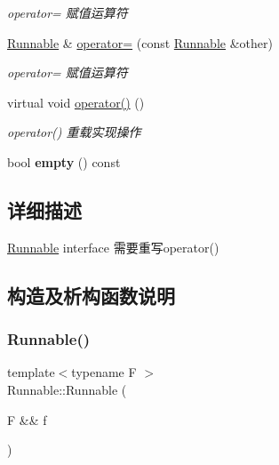 \begin{DoxyCompactItemize}
\begin{DoxyCompactList}\small\item\em operator= 赋值运算符 \end{DoxyCompactList}\item 
\hyperlink{classRunnable}{Runnable} \& \hyperlink{classRunnable_aac70062e7bc1f55cc1695fa37d75df53}{operator=} (const \hyperlink{classRunnable}{Runnable} \&other)
\begin{DoxyCompactList}\small\item\em operator= 赋值运算符 \end{DoxyCompactList}\item 
\mbox{\label{classRunnable_a38bf849dab4bbb86fc5bc6e7aff383e0}} 
virtual void \hyperlink{classRunnable_a38bf849dab4bbb86fc5bc6e7aff383e0}{operator()} ()
\begin{DoxyCompactList}\small\item\em operator() 重载实现操作 \end{DoxyCompactList}\item 
\mbox{\label{classRunnable_a3abba14a5cf19709cef2d299ee68acae}} 
bool {\bfseries empty} () const
\end{DoxyCompactItemize}


\subsection{详细描述}
\hyperlink{classRunnable}{Runnable} interface 需要重写operator() 

\subsection{构造及析构函数说明}
\mbox{\label{classRunnable_ab052afa8b53dd1e7c28e978962839446}} 
\subsubsection{\texorpdfstring{Runnable()}{Runnable()}\hspace{0.1cm}{\footnotesize\ttfamily [1/4]}}
{\footnotesize\ttfamily template$<$typename F $>$ \\
Runnable\+::\+Runnable (\begin{DoxyParamCaption}\item[{F \&\&}]{f }\end{DoxyParamCaption})\hspace{0.3cm}{\ttfamily [inline]}}



